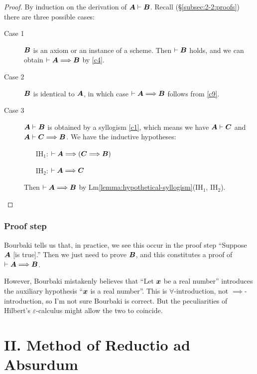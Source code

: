 \begin{proof}
By induction on the derivation of $\boldsymbol{A}\vdash\boldsymbol{B}$.
Recall (\S\ref{subsec:2-2:proofs}) there are three possible cases:
\begin{description}
\item[Case 1] $\boldsymbol{B}$ is an axiom or an instance of a
  scheme. Then $\vdash\boldsymbol{B}$ holds, and we can obtain
  $\vdash\boldsymbol{A}\Longrightarrow\boldsymbol{B}$ by \ref{c4}.
\item[Case 2] $\boldsymbol{B}$ is identical to $\boldsymbol{A}$, in
  which case $\vdash\boldsymbol{A}\Longrightarrow\boldsymbol{B}$ follows
  from \ref{c9}.
\item[Case 3] $\boldsymbol{A}\vdash\boldsymbol{B}$ is obtained by a
  syllogism \ref{c1}, which means we have
  $\boldsymbol{A}\vdash\boldsymbol{C}$ and
  $\boldsymbol{A}\vdash\boldsymbol{C}\Longrightarrow\boldsymbol{B}$. We
  have the inductive hypotheses:
  \begin{itemize}
  \item[IH${}_{1}$:] $\vdash\boldsymbol{A}\Longrightarrow(\boldsymbol{C}\Longrightarrow\boldsymbol{B})$
  \item[IH${}_{2}$:] $\vdash\boldsymbol{A}\Longrightarrow\boldsymbol{C}$
  \end{itemize}
\noindent Then $\vdash\boldsymbol{A}\Longrightarrow\boldsymbol{B}$ by Lm\ref{lemma:hypothetical-syllogism}(IH${}_{1}$, IH${}_{2}$).
\end{description}
\end{proof}

\subsubsection{Proof step}
Bourbaki tells us that, in practice, we see this occur in the proof step
``Suppose $\boldsymbol{A}$ [is true].'' Then we just need to prove
$\boldsymbol{B}$, and this constitutes a proof of $\vdash\boldsymbol{A}\Longrightarrow\boldsymbol{B}$.

However, Bourbaki mistakenly believes that ``Let $\boldsymbol{x}$ be a
real number'' introduces the auxiliary hypothesis ``$\boldsymbol{x}$
is a real number''. This is $\forall$-introduction, not
$\implies$-introduction, so I'm not sure Bourbaki is correct. But the
peculiarities of Hilbert's $\varepsilon$-calculus might allow the two to
coincide. 

\section*{II. Method of Reductio ad Absurdum}

